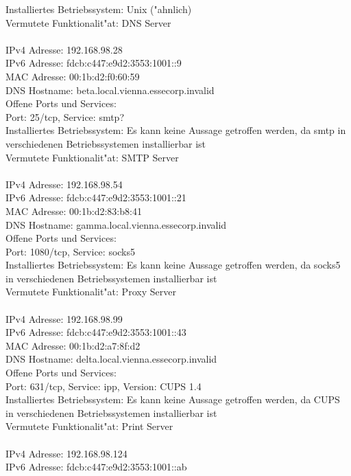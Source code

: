 \documentclass[12pt,a4paper,titlepage,oneside]{scrartcl}
\begin{document}
Installiertes Betriebssystem: Unix ("ahnlich)\\
Vermutete Funktionalit"at: DNS Server\\
\\
IPv4 Adresse: 192.168.98.28\\
IPv6 Adresse: fdcb:c447:e9d2:3553:1001::9\\
MAC Adresse: 00:1b:d2:f0:60:59\\
DNS Hostname: beta.local.vienna.essecorp.invalid\\
Offene Ports und Services:\\
Port: 25/tcp, Service: smtp?\\
Installiertes Betriebssystem: Es kann keine Aussage getroffen werden, da smtp in verschiedenen Betriebssystemen installierbar ist\\
Vermutete Funktionalit"at: SMTP Server\\
\\
IPv4 Adresse: 192.168.98.54\\
IPv6 Adresse: fdcb:c447:e9d2:3553:1001::21\\
MAC Adresse: 00:1b:d2:83:b8:41\\
DNS Hostname: gamma.local.vienna.essecorp.invalid\\
Offene Ports und Services:\\
Port: 1080/tcp, Service: socks5\\
Installiertes Betriebssystem: Es kann keine Aussage getroffen werden, da socks5 in verschiedenen Betriebssystemen installierbar ist\\
Vermutete Funktionalit"at: Proxy Server\\
\\
IPv4 Adresse: 192.168.98.99\\
IPv6 Adresse: fdcb:c447:e9d2:3553:1001::43\\
MAC Adresse: 00:1b:d2:a7:8f:d2\\
DNS Hostname: delta.local.vienna.essecorp.invalid\\
Offene Ports und Services:\\
Port: 631/tcp, Service: ipp, Version: CUPS 1.4\\
Installiertes Betriebssystem: Es kann keine Aussage getroffen werden, da CUPS in verschiedenen Betriebssystemen installierbar ist\\
Vermutete Funktionalit"at: Print Server\\
\\
IPv4 Adresse: 192.168.98.124\\
IPv6 Adresse: fdcb:c447:e9d2:3553:1001::ab\\
\end{document}
